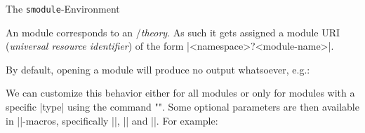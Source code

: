 \begin{sfragment}{The \texttt{smodule}-Environment}
    \begin{mmtbox}
        An \sTeX module corresponds to an \mmt/\omdoc \emph{theory}.
        As such it gets assigned a module URI (\emph{universal resource identifier})
        of the form |<namespace>?<module-name>|.
    \end{mmtbox}

    By default, opening a module will produce no output whatsoever,
    e.g.:

    \begin{function}{\stexpatchmodule}
        We can customize this behavior either for all modules or
        only for modules with a specific |type| using the command
        \stexcode"".
        Some optional parameters are then available in |\smodule*|-macros,
        specifically |\smoduletitle|, |\smoduletype| and |\smoduleid|.
        For example:


    \end{function}
\end{sfragment}